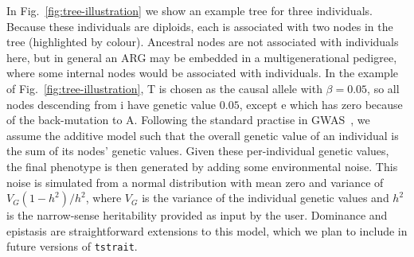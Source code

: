 \documentclass[unnumsec,webpdf,modern,large,namedate]{oup-authoring-template}%
\begin{document}
In Fig.~\ref{fig:tree-illustration} we show an example
tree for three individuals.
Because these individuals are diploids, each is associated
with two nodes in the tree (highlighted by colour).
Ancestral nodes are not associated with individuals here,
but in general an ARG may be embedded in a multigenerational
pedigree, where some internal nodes would be associated
with individuals.
In the example of
Fig.~\ref{fig:tree-illustration}, T is chosen as the causal
allele with $\beta=0.05$,
so all nodes descending from \textsf{i}
have genetic value $0.05$, except \textsf{e} which
has zero because of the back-mutation to A.
Following the standard practise in GWAS~\citep{uffelmann2021},
we assume the additive model such that the overall
genetic value of an individual is the sum of its
nodes' genetic values.
Given these per-individual genetic values, the final phenotype
is then generated by adding some environmental noise.
This noise is simulated from a normal distribution with mean zero
and variance of $V_G(1-h^2)/{h^2}$,
where $V_G$ is the variance of the individual genetic values
and $h^2$ is the narrow-sense heritability provided as input by the user.
Dominance and epistasis are straightforward extensions to this
model, which we plan to include in future versions of \texttt{tstrait}.
\end{document}

